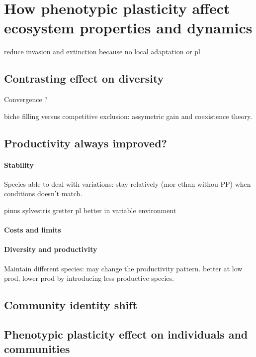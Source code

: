 \section{How phenotypic plasticity affect ecosystem properties and dynamics}

reduce invasion and extinction because no local adaptation or pl \cite{morin_comparing_2009}


\subsection{Contrasting effect on diversity}

Convergence ?

biche filling versus competitive exclusion: assymetric gain and coexistence theory.

\subsection{Productivity always improved?}

\paragraph{Stability}

Species able to deal with variations: stay relatively (mor ethan withou PP) when conditions doesn't match.

pinus sylvestris gretter pl better in variable environment \cite{richter_phenotypic_2012}


\paragraph{Costs and limits}

\paragraph{Diversity and productivity}
Maintain different species: may change the productivity pattern. better at low prod, lower prod by introducing less productive species.


\subsection{Community identity shift}

\textbf{}


\subsection{Phenotypic plasticity effect on individuals and communities}

